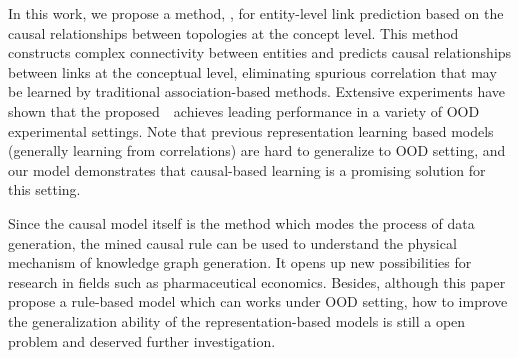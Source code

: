 In this work, we propose a method, \dname, for entity-level link prediction based on the causal relationships between topologies at the concept level.
This method constructs complex connectivity between entities and predicts causal relationships between links at the conceptual level, eliminating spurious correlation that may be learned by traditional association-based methods.
Extensive experiments have shown that the proposed~\dname ~achieves leading performance in a variety of OOD experimental settings.
Note that previous representation learning based models (generally learning from correlations) are hard to generalize to OOD setting, and our model demonstrates that causal-based learning is a promising solution for this setting.

Since the causal model itself is the method which modes the process of data generation, the mined causal rule can be used to understand the physical  mechanism of knowledge graph generation. It opens up new possibilities for research in fields such as pharmaceutical economics.
Besides, although this paper propose a rule-based model which can works under OOD setting, how to improve the generalization ability of the representation-based models is still a open problem and deserved further investigation.
